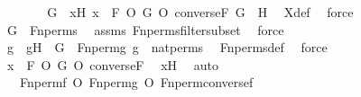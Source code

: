 \begin{isabellebody}
\ \ \ \ \isamarkupfalse%
\ \isamarkupfalse%
\ G\ \ xH{\isacharcolon}{\kern0pt}\ {\isachardoublequoteopen}x\ {\isacharequal}{\kern0pt}\ F\ O\ G\ O\ converse{\isacharparenleft}{\kern0pt}F{\isacharparenright}{\kern0pt}{\isachardoublequoteclose}\ {\isachardoublequoteopen}G\ {\isasymin}\ H{\isachardoublequoteclose}\ \isamarkupfalse%
\ X{\isacharunderscore}{\kern0pt}def\ \isamarkupfalse%
\ force\ \isanewline
\ \ \ \ \isamarkupfalse%
\ \isamarkupfalse%
\ {\isachardoublequoteopen}G\ {\isasymin}\ Fn{\isacharunderscore}{\kern0pt}perms{\isachardoublequoteclose}\ \isamarkupfalse%
\ assms\ Fn{\isacharunderscore}{\kern0pt}perms{\isacharunderscore}{\kern0pt}filter{\isacharunderscore}{\kern0pt}subset\ \isamarkupfalse%
\ force\ \isanewline
\ \ \ \ \isamarkupfalse%
\ \isamarkupfalse%
\ g\ \ gH\ {\isacharcolon}{\kern0pt}\ {\isachardoublequoteopen}G\ {\isacharequal}{\kern0pt}\ Fn{\isacharunderscore}{\kern0pt}perm{\isacharprime}{\kern0pt}{\isacharparenleft}{\kern0pt}g{\isacharparenright}{\kern0pt}{\isachardoublequoteclose}\ {\isachardoublequoteopen}g\ {\isasymin}\ nat{\isacharunderscore}{\kern0pt}perms{\isachardoublequoteclose}\ \isamarkupfalse%
\ Fn{\isacharunderscore}{\kern0pt}perms{\isacharunderscore}{\kern0pt}def\ \isamarkupfalse%
\ force\ \isanewline
\ \ \ \ \isamarkupfalse%
\ \isamarkupfalse%
\ {\isachardoublequoteopen}x\ {\isacharequal}{\kern0pt}\ F\ O\ G\ O\ converse{\isacharparenleft}{\kern0pt}F{\isacharparenright}{\kern0pt}{\isachardoublequoteclose}\ \isamarkupfalse%
\ xH\ \isamarkupfalse%
\ auto\ \isanewline
\ \ \ \ \isamarkupfalse%
\ \isamarkupfalse%
\ {\isachardoublequoteopen}{\isachardot}{\kern0pt}{\isachardot}{\kern0pt}{\isachardot}{\kern0pt}\ {\isacharequal}{\kern0pt}\ {\isacharparenleft}{\kern0pt}Fn{\isacharunderscore}{\kern0pt}perm{\isacharprime}{\kern0pt}{\isacharparenleft}{\kern0pt}f{\isacharparenright}{\kern0pt}\ O\ Fn{\isacharunderscore}{\kern0pt}perm{\isacharprime}{\kern0pt}{\isacharparenleft}{\kern0pt}g{\isacharparenright}{\kern0pt}{\isacharparenright}{\kern0pt}\ O\ Fn{\isacharunderscore}{\kern0pt}perm{\isacharprime}{\kern0pt}{\isacharparenleft}{\kern0pt}converse{\isacharparenleft}{\kern0pt}f{\isacharparenright}{\kern0pt}{\isacharparenright}{\kern0pt}{\isachardoublequoteclose}\ \isanewline
\ \ \ \ \ \ \isamarkupfalse%

\end{isabellebody}
